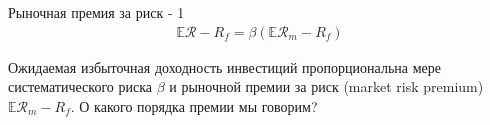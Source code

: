 \documentclass{beamer}
\begin{document}
\begin{frame}{Рыночная премия за риск - 1}
\begin{align*}
\mathbb{E}\mathcal{R} - R_f = \beta(\mathbb{E}\mathcal{R}_m - R_f)
\end{align*}

\justify
Ожидаемая избыточная доходность инвестиций пропорциональна мере 
систематического риска $\beta$ и рыночной премии за риск (market risk premium) 
$\mathbb{E}\mathcal{R}_m - R_f$. О какого порядка премии мы говорим?
\end{frame}



    \renewcommand{\addGrowthPlot}[4]{
        \addplot[
            color = #2,
            line width = 1pt, 
            mark = #3,
            mark repeat = 120,
            mark phase = 396,
            mark options = {scale=2},
            style = #4
        ]
        table[
            x = date,
            y = #1,
            col sep = comma
        ]
        {data/fama_french_cumulative_growth_data.csv};
    }
    
    \newcommand{\addFlatLine}[5] {
        \draw[
            red,
            thick
        ]
        (axis cs: #1, #3) -- (axis cs: #2, #3)
        node[
            pos=#5,
            anchor=south
        ]
        {\scriptsize #4};
    }
    
    \newcommand{\addLossLine}[5] {
        \draw[
            red,
            thick
        ]
        (axis cs: #1, #3) -- (axis cs: #2, #4)
        node[
            anchor=west
        ]
        {\scriptsize #5\%};
    }
\end{document}
